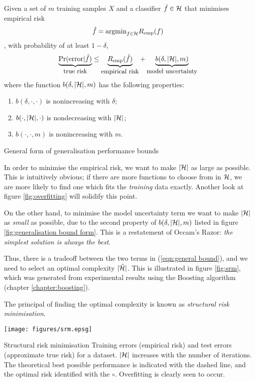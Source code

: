 \begin{linefigure}
Given a set of $m$ training samples $X$ and a classifier $\hat{f} \in \mathcal{H}$
that minimises empirical risk
\begin{equation*}
\hat{f} = \mathrm{argmin}_{f \in
\mathcal{H}} R_{\mathrm{emp}}(f)
\end{equation*}
, with probability of at least $1 - \delta$,
%
\begin{equation}
\underbrace{\Pr(\mathrm{error}|\hat{f})}_{\mbox{\small{true risk}}} \leq 
\underbrace{R_{\mathrm{emp}}(\hat{f})}_{\mbox{\small{empirical risk}}} +
\underbrace{b(\delta, |\mathcal{H}|, m)}_{\mbox{\small{model uncertainty}}}
\label{eqn:general bound}
\end{equation}
%
where the function $b(\delta, |\mathcal{H}|, m)$ has the following
properties:
\begin{enumerate}
\item	$b(\delta, \cdot, \cdot)$ is nonincreasing with $\delta$;
\item	$b(\cdot, |\mathcal{H}|, \cdot)$ is nondecreasing with $|\mathcal{H}|$;
\item	$b(\cdot, \cdot, m)$ is nonincreasing with $m$.
\end{enumerate}
\caption{General form of generalisation performance bounds}
\label{fig:generalisation bound form}
\end{linefigure}

In order to minimise the empirical risk, we want to make $|\mathcal{H}|$ as
large as possible.  This is intuitively obvious; if there are more
functions to choose from in $\mathcal{H}$, we are more likely to find one
which fits the \emph{training} data exactly.  Another look at figure
\ref{fig:overfitting} will solidify this point.

On the other hand, to minimise the model uncertainty term we want to make
$|\mathcal{H}|$ as \emph{small} as possible, due to the second property of
$b(\delta, |\mathcal{H}|, m)$ listed in figure \ref{fig:generalisation bound
form}.  This is a restatement of Occam's Razor: \emph{the simplest
solution is always the best}.

Thus, there is a tradeoff between the two terms in (\ref{eqn:general
bound}), and we need to select an optimal complexity $|\hat{\mathcal{H}}|$.
This is illustrated in figure \ref{fig:srm}, which was generated from
experimental results using the Boosting algorithm (chapter
\ref{chapter:boosting}).

The principal of finding the optimal complexity is known as
\emph{structural risk minimisation}.

\begin{linefigure}
\begin{center}
\texttt{[image: figures/srm.epsg]}
\end{center}
\begin{capt}{Structural risk minimisation}
Training errors (empirical risk) and test errors (approximate true
risk) for a dataset.  $|\mathcal{H}|$ increases with the number of
iterations.  The theoretical best possible performance is
indicated with the dashed line, and the optimal risk identified with
the $\circ$.  Overfitting is clearly seen to occur.
\end{capt}
\label{fig:overfitting}
\end{linefigure}


